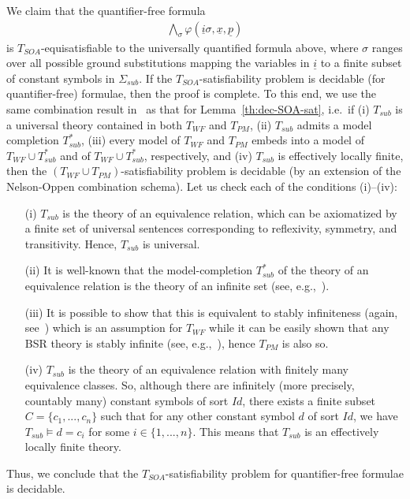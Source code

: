 \documentclass[conference]{IEEEtran}
\begin{document}
\begin{LONG}
\begin{IEEEproof}
  We claim that the quantifier-free formula 
  \begin{eqnarray*}
    \bigwedge_{\sigma} 
     \varphi(\underline{i}\sigma,\underline{x},\underline{p}) 
  \end{eqnarray*}
  is $T_\mathit{SOA}$-equisatisfiable to the universally quantified formula
  above, where $\sigma$ ranges over all possible ground substitutions
  mapping the variables in $\underline{i}$ to a finite subset of
  constant symbols in $\Sigma_\mathit{sub}$.  If the $T_\mathit{SOA}$-satisfiability
  problem is decidable (for quantifier-free) formulae, then the proof
  is complete.  To this end, we use the same combination result
  in~\cite{ghilardi-jar} as that for Lemma~\ref{th:dec-SOA-sat}, i.e.\ if
  (i) $T_\mathit{sub}$ is a universal theory contained in both $T_\mathit{WF}$ and
  $T_\mathit{PM}$, (ii) $T_\mathit{sub}$ admits a model completion $T_\mathit{sub}^*$,
  (iii) every model of $T_\mathit{WF}$ and $T_\mathit{PM}$ embeds into a model of
  $T_\mathit{WF}\cup T_\mathit{sub}^*$ and of $T_\mathit{WF}\cup T_\mathit{sub}^*$, respectively,
  and (iv) $T_\mathit{sub}$ is effectively locally finite, then the
  $(T_\mathit{WF}\cup T_\mathit{PM})$-satisfiability problem is decidable (by an
  extension of the Nelson-Oppen combination schema).  Let us check
  each of the conditions (i)--(iv):
  \begin{itemize}
  \item[(i)] $T_\mathit{sub}$ is the theory of an equivalence relation, which
    can be axiomatized by a finite set of universal sentences
    corresponding to reflexivity, symmetry, and transitivity.  Hence,
    $T_\mathit{sub}$ is universal.
  \item[(ii)] It is well-known that the model-completion $T_\mathit{sub}^*$
    of the theory of an equivalence relation is the theory of an
    infinite set (see, e.g.,~\cite{ghilardi-jar}).
  \item[(iii)] It is possible to show that this is equivalent to
    stably infiniteness (again, see~\cite{ghilardi-jar}) which is an
    assumption for $T_\mathit{WF}$ while it can be easily shown that any BSR
    theory is stably infinite (see, e.g.,~\cite{tinelli-zarba}), hence
    $T_\mathit{PM}$ is also so.
  \item[(iv)] $T_\mathit{sub}$ is the theory of an equivalence relation with
    finitely many equivalence classes.  So, although there are
    infinitely (more precisely, countably many) constant symbols of
    sort $\mathit{Id}$, there exists a finite subset $C=\{c_1, ...,
    c_n\}$ such that for any other constant symbol $d$ of sort
    $\mathit{Id}$, we have $T_\mathit{sub} \models d=c_i$ for some $i\in\{1,
    ..., n\}$.  This means that $T_\mathit{sub}$ is an effectively locally
    finite theory.
  \end{itemize}
  Thus, we conclude that the $T_\mathit{SOA}$-satisfiability problem for
  quantifier-free formulae is decidable.  


\end{IEEEproof}
\end{LONG}
\end{document}
